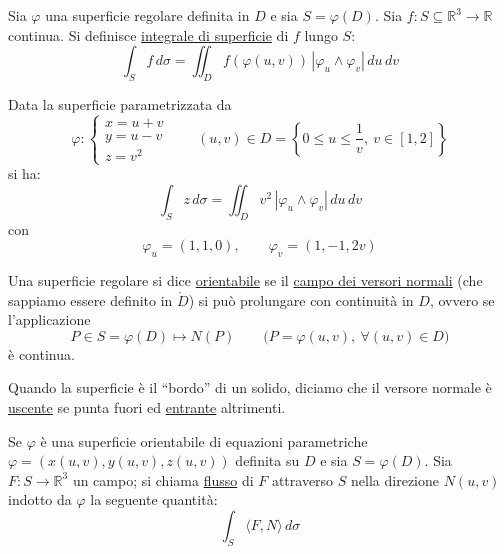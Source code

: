 \begin{definition}
Sia $\varphi$ una superficie regolare definita in $D$ e sia $S = \varphi(D)$. Sia $f : S \subseteq \mathbb{R}^3 \to \mathbb{R}$ continua. Si definisce \underline{integrale di superficie} di $f$ lungo $S$:
\[
\boxed{\int_S f\, d\sigma = \iint_D f(\varphi(u, v))\, |\varphi_u \wedge \varphi_v|\, du\, dv}
\]
\end{definition}

\begin{esercizio}[EXE]
Data la superficie parametrizzata da
\[
\varphi : \begin{cases}
x = u + v \\
y = u - v \\
z = v^2
\end{cases}
\qquad (u, v) \in D = \left\{ 0 \le u \le \frac{1}{v}, \ v \in [1, 2] \right\}
\]
si ha:
\[
\int_S z\, d\sigma = \iint_D v^2\, |\varphi_u \wedge \varphi_v|\, du\, dv
\]
con
\[
\varphi_u = (1, 1, 0), \qquad \varphi_v = (1, -1, 2v)
\]
\end{esercizio}

\begin{definition}
Una superficie regolare si dice \underline{orientabile} se il \underline{campo dei versori normali} (che sappiamo essere definito in $\mathring{D}$) si può prolungare con continuità in $D$, ovvero se l'applicazione
\[
P \in S = \varphi(D) \longmapsto N(P) \qquad \big(P = \varphi(u, v), \ \forall (u, v) \in D\big)
\]
è continua.
\end{definition}

\begin{oss}
Quando la superficie è il ``bordo'' di un solido, diciamo che il versore normale è \underline{uscente} se punta fuori ed \underline{entrante} altrimenti.
\end{oss}

\begin{definition}
Se $\varphi$ è una superficie orientabile di equazioni parametriche $\varphi = (x(u, v), y(u, v), z(u, v))$ definita su $D$ e sia $S = \varphi(D)$. Sia $F : S \to \mathbb{R}^3$ un campo; si chiama \underline{flusso} di $F$ attraverso $S$ nella direzione $N(u, v)$ indotto da $\varphi$ la seguente quantità:
\[
\int_S \langle F, N \rangle\, d\sigma
\]
\end{definition}